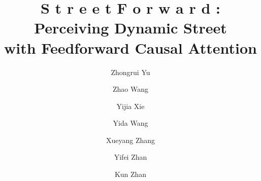 \documentclass[sigconf,nonacm]{acmart}
\newcommand{\StreetForward}{%
  \textbf{%
    \textcolor[rgb]{0.00,0.70,1.00}{S}%
    \textcolor[rgb]{0.00,0.62,0.98}{t}%
    \textcolor[rgb]{0.00,0.55,0.95}{r}%
    \textcolor[rgb]{0.00,0.48,0.92}{e}%
    \textcolor[rgb]{0.00,0.42,0.88}{e}%
    \textcolor[rgb]{0.00,0.36,0.84}{t}%
    \textcolor[rgb]{0.12,0.32,0.86}{F}%
    \textcolor[rgb]{0.22,0.40,0.90}{o}%
    \textcolor[rgb]{0.35,0.45,0.94}{r}%
    \textcolor[rgb]{0.50,0.42,0.95}{w}%
    \textcolor[rgb]{0.62,0.36,0.95}{a}%
    \textcolor[rgb]{0.72,0.30,0.92}{r}%
    \textcolor[rgb]{0.80,0.25,0.88}{d}%
  }%
}
\begin{document}
\title[\StreetForward]{\StreetForward: Perceiving Dynamic Street \\ with Feedforward Causal Attention}

\author{Zhongrui Yu}



\author{Zhao Wang}
  
\author{Yijia Xie}


\author{Yida Wang}
\author{Xueyang Zhang}
\author{Yifei Zhan}
\author{Kun Zhan}



\renewcommand{\shortauthors}{Yu et al.}
\end{document}
